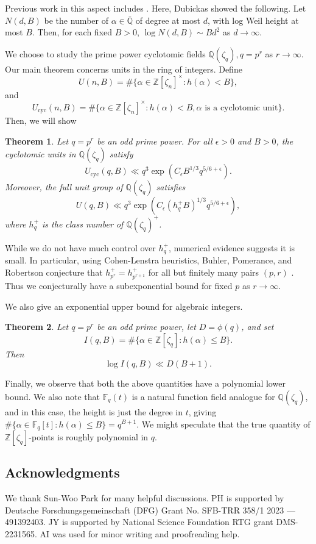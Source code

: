 \documentclass[10pt,a4paper]{amsart}
\newtheorem{thm}{Theorem}
\newcommand{\bF}{\mathbb{F}}
\newcommand{\bQ}{\mathbb{Q}}
\newcommand{\bZ}{\mathbb{Z}}
\DeclareMathOperator{\cyc}{cyc}
\def\bbF{ {\mathbb F}}
\def\bbQ{ {\mathbb Q}}
\def\bbZ{ {\mathbb Z}}
\begin{document}
Previous work in this aspect includes \cite{DUBICKAS_2018}. Here, Dubickas showed the following. Let $N(d, B)$ be the number of $\alpha \in \bar \bbQ$ of degree at most $d$, with log Weil height at most $B$. Then, for each fixed $B > 0$, $\log N(d, B) \sim B d^2$ as $d \to \infty$. 

We choose to study the prime power cyclotomic fields $\bQ(
\zeta_q), q = p^r$ as $r \to \infty$. Our main theorem concerns units in the ring of integers. Define
\[
U(n,B) = \# \{\alpha \in \bbZ[\zeta_n]^{\times}: h(\alpha) < B\},
\]
and
\[
U_{\cyc}(n,B) = \# \{\alpha \in \bbZ[\zeta_n]^{\times}: h(\alpha) < B, \alpha \text{ is a cyclotomic unit}\}.
\]
Then, we will show
\begin{thm} \label{thm:main}
    Let $q=p^r$ be an odd prime power. For all $\epsilon > 0$ and $B>0$, the cyclotomic units in $\bQ(\zeta_q)$ satisfy
    \[
    U_{\cyc}(q,B) \ll q^3 \exp \left( C_\epsilon B^{1/3} q^{5/6+\epsilon} \right).
    \]
    Moreover, the full unit group of $\bQ(\zeta_q)$ satisfies
    \[
    U(q,B) \ll q^3 \exp \left( C_\epsilon (h_q^+ B)^{1/3} q^{5/6+\epsilon} \right),
    \]
    where $h_q^+$ is the class number of $\bQ(\zeta_q)^+$.
\end{thm}

While we do not have much control over $h^+_q$, numerical evidence suggests it is small. In particular, using Cohen-Lenstra heuristics, Buhler, Pomerance, and Robertson conjecture that $h_{p^r}^+=h_{p^{r+1}}^+$ for all but finitely many pairs $(p,r)$ \cite{BPR2004}. Thus we conjecturally have a subexponential bound for fixed $p$ as $r \to \infty$.

We also give an exponential upper bound for algebraic integers.



\begin{thm} \label{thm:integers}
Let $q=p^r$ be an odd prime power, let $D=\phi(q)$, and set
\[
I(q,B)=\#\{ \alpha \in \bZ[\zeta_q] : h(\alpha) \leq B \}.
\]
Then
\[
\log I(q,B) \ll D(B+1).
\]
\end{thm}


Finally, we observe that both the above quantities have a polynomial lower bound. We also note that $\bF_q(t)$ is a natural function field analogue for $\bQ(\zeta_q)$, and in this case, the height is just the degree in $t$, giving $\# \{\alpha \in \bbF_q[t]: h(\alpha) \leq B\} = q^{B+1}$. We might speculate that the true quantity of $\bZ[\zeta_q]$-points is roughly polynomial in $q$.

\subsection{Acknowledgments}
We thank Sun-Woo Park for many helpful discussions. PH is supported by Deutsche Forschungsgemeinschaft (DFG) Grant No. SFB-TRR 358/1 2023 — 491392403. JY is supported by National Science Foundation RTG grant DMS-2231565. AI was used for minor writing and proofreading help. 
\end{document}
